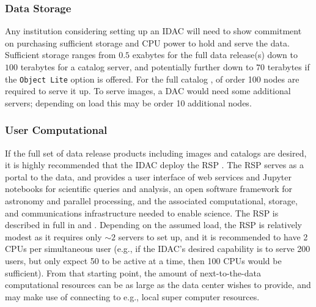 \subsubsection{Data Storage}
Any institution considering setting up an \gls{IDAC} will need to show commitment on purchasing sufficient storage and \gls{CPU} power to hold and serve the data. Sufficient storage ranges from $0.5$ exabytes for the full data release(s) down to $100$ terabytes for a catalog server, and potentially further down to $70$ terabytes if the {\tt Object Lite} option is offered. For the full catalog , of order 100 nodes are required to serve it up. To serve images, a \gls{DAC} would need some additional servers; depending on load this may be order 10 additional nodes.

\subsubsection{User Computational}
If the full set of data release products including images and catalogs are desired, it is highly recommended that the \gls{IDAC} deploy the \gls{RSP} . The \gls{RSP} serves as a portal to the data, and provides a user interface of web services and Jupyter notebooks for scientific queries and analysis, an open software framework for astronomy and parallel processing, and the associated computational, storage, and communications infrastructure needed to enable science. The \gls{RSP} is described in full in  and . Depending on the assumed load, the \gls{RSP} is relatively modest as it requires only $\sim2$ servers to set up, and it is recommended to have 2 CPUs per simultaneous user (e.g., if the \gls{IDAC}'s desired capability is to serve 200 users, but only expect 50 to be active at a time, then 100 CPUs would be sufficient). From that starting point, the amount of next-to-the-data computational resources can be as large as the data center wishes to provide, and may make use of connecting to e.g., local super computer resources.

